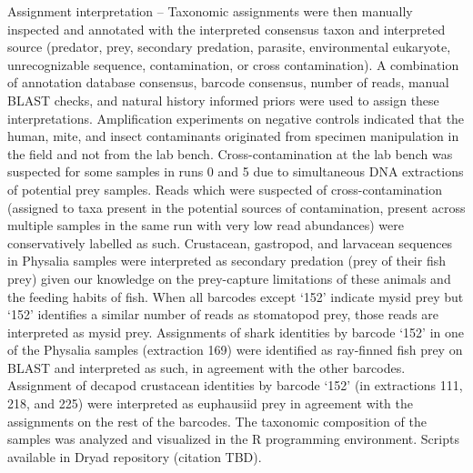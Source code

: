 \documentclass[12pt,]{article}
\begin{document}
Assignment interpretation -- Taxonomic assignments were then manually inspected and annotated with the interpreted consensus taxon and interpreted source (predator, prey, secondary predation, parasite, environmental eukaryote, unrecognizable sequence, contamination, or cross contamination). A combination of annotation database consensus, barcode consensus, number of reads, manual BLAST checks, and natural history informed priors were used to assign these interpretations. Amplification experiments on negative controls indicated that the human, mite, and insect contaminants originated from specimen manipulation in the field and not from the lab bench. Cross-contamination at the lab bench was suspected for some samples in runs 0 and 5 due to simultaneous DNA extractions of potential prey samples. Reads which were suspected of cross-contamination (assigned to taxa present in the potential sources of contamination, present across multiple samples in the same run with very low read abundances) were conservatively labelled as such. Crustacean, gastropod, and larvacean sequences in Physalia samples were interpreted as secondary predation (prey of their fish prey) given our knowledge on the prey-capture limitations of these animals and the feeding habits of fish. When all barcodes except `152' indicate mysid prey but `152' identifies a similar number of reads as stomatopod prey, those reads are interpreted as mysid prey. Assignments of shark identities by barcode `152' in one of the Physalia samples (extraction 169) were identified as ray-finned fish prey on BLAST and interpreted as such, in agreement with the other barcodes. Assignment of decapod crustacean identities by barcode `152' (in extractions 111, 218, and 225) were interpreted as euphausiid prey in agreement with the assignments on the rest of the barcodes. The taxonomic composition of the samples was analyzed and visualized in the R programming environment. Scripts available in Dryad repository (citation TBD).
\end{document}
